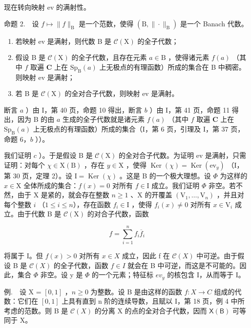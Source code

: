 现在转向映射 ev 的满射性。

命题 2.　设 \(f \mapsto \|f\|_{\mathrm{B}}\) 是一个范数，使得 \((\mathrm{B}, \| \cdot \|_{\mathrm{B}})\) 是一个 Banach 代数。

\begin{enumerate}
\def\labelenumi{\alph{enumi})}
\item
  若映射 ev 是满射，则代数 B 是 \(\mathcal{C}(\mathrm{X})\) 的全子代数；
\item
  假设 B 是 \(\mathcal{C}(\mathrm{X})\) 的全子代数，且存在元素 \(a \in \mathrm{B}\) ，使得诸元素 \(f(a)\) （其中 \(f\) 取遍 \(\mathbf{C}\) 上在 \(\mathrm{Sp}_{\mathrm{B}}(a)\) 上无极点的有理函数）所成的集合在 B 中稠密。则映射 ev 是满射；
\item
  若 B 是 \(\mathcal{C}(\mathrm{X})\) 的全对合子代数，则映射 ev 是满射。
\end{enumerate}

断言 \(a\) ）由 I，第 40 页，命题 10 得出，断言 \(b\) ）由 I，第 41 页，命题 11 得出，因为 B 的由 \(a\) 生成的全子代数就是诸元素 \(f(a)\) （其中 \(f\) 取遍 \(\mathbf{C}\) 上在 \(\mathrm{Sp}_{\mathrm{B}}(a)\) 上无极点的有理函数）所成的集合（I，第 6 页，引理及 I，第 37 页，命题 6，\(b\) ））。

我们证明 \(c\) ）。于是假设 B 是 \(\mathcal{C}(\mathrm{X})\) 的全对合子代数。为证明 ev 是满射，只需证明：对每个 \(\chi \in \mathrm{X}(\mathrm{B})\) ，存在 \(y \in \mathrm{X}\) ，使得 \(\operatorname{Ker}(\chi) = \operatorname{Ker}(\mathrm{ev}_y)\) （I，第 30 页，定理 2）。设 \(\mathrm{I} = \operatorname{Ker}(\chi)\) 。这是 B 的一个极大理想。设 \(\Phi\) 为这样的 \(x \in \mathrm{X}\) 全体所成的集合：\(f(x) = 0\) 对所有 \(f \in \mathrm{I}\) 成立。我们证明 \(\Phi\) 非空。若不然，由于 X 是紧的，就会存在整数 \(n \geqslant 1\) 、X 的开覆盖 \((\mathrm{V}_1, \ldots, \mathrm{V}_n)\) ，并且对每个整数 \(i\) （\(1 \leqslant i \leqslant n\)），存在函数 \(f_i \in \mathrm{I}\) ，使得 \(f_i(x) \neq 0\) 对所有 \(x \in \mathrm{V}_i\) 成立。由于代数 B 是 \(\mathcal{C}(\mathrm{X})\) 的对合子代数，函数

\[
f = \sum_ {i = 1} ^ {n} f _ {i} \overline {{f}} _ {i}
\]

将属于 I。但 \(f(x) > 0\) 对所有 \(x \in X\) 成立，因此 f 在 \(\mathcal{C}(X)\) 中可逆。由于假设 B 是 \(\mathcal{C}(X)\) 的全子代数，函数 \(f \in I\) 就会在 B 中可逆，而这是不可能的。因此，集合 \(\Phi\) 非空。设 y 是 \(\Phi\) 的一个元素；特征标 \(ev_{y}\) 的核包含 I，从而等于 I。

例.　设 X = \([0,1]\) ，\(n \geqslant 0\) 为整数。设 B 是由这样的函数 \(f: X \to C\) 组成的代数：它们在 \([0,1]\) 上具有直到 n 阶的连续导数，且赋以 I，第 18 页，例 4 中所考虑的范数。则 B 是 \(\mathcal{C}(X)\) 的分离 X 的点的全对合子代数，因而 \(\mathsf{X}(\mathsf{B})\) 可等同于 X。

